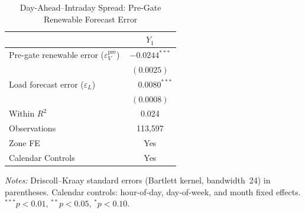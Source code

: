 \documentclass{article}
\begin{document}
\begin{table}[htbp]
\centering
\caption{Day-Ahead--Intraday Spread: Pre-Gate Renewable Forecast Error}
\label{tab:2}
\begin{threeparttable}
\begin{tabularx}{\linewidth}{>{\raggedright\arraybackslash}Xc}
\toprule
 & $Y_1$ \\
\midrule
Pre-gate renewable error ($\varepsilon_V^{\mathrm{pre}}$) & $-0.0244^{***}$ \\
 & $(0.0025)$ \\[0.4ex]
Load forecast error ($\varepsilon_L$) & $\phantom{-}0.0080^{***}$ \\
 & $(0.0008)$ \\
\midrule
Within $R^2$ & 0.024 \\
Observations & 113,597 \\
Zone FE & Yes \\
Calendar Controls & Yes \\
\bottomrule
\end{tabularx}
\begin{tablenotes}[flushleft]
\footnotesize
\item \textit{Notes:} Driscoll--Kraay standard errors (Bartlett kernel, bandwidth~24) in parentheses. Calendar controls: hour-of-day, day-of-week, and month fixed effects. $^{***}p<0.01$, $^{**}p<0.05$, $^{*}p<0.10$.
\end{tablenotes}
\end{threeparttable}
\end{table}
\end{document}
